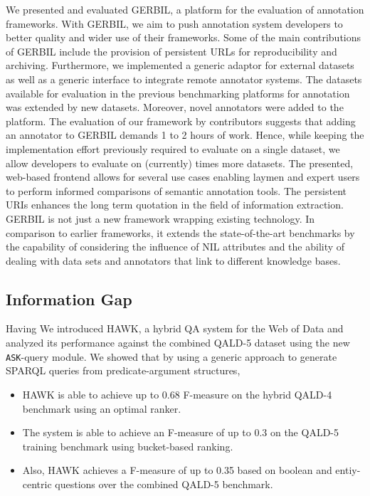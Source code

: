 We presented and evaluated GERBIL, a platform for the evaluation of annotation frameworks. With GERBIL, we aim to push annotation system developers to better quality and wider use of their frameworks.
Some of the main contributions of GERBIL include the provision of persistent URLs for reproducibility and archiving.
Furthermore, we implemented a generic adaptor for external datasets as well as a generic interface to integrate remote annotator systems.
The datasets available for evaluation in the previous benchmarking platforms for annotation was extended by \numberOfadditionalDatasets new datasets. Moreover, \numberOfadditionalAnnotators novel annotators were added to the platform. 
The evaluation of our framework by contributors suggests that adding an annotator to GERBIL demands 1 to 2 hours of work. Hence, while keeping the implementation effort previously required to evaluate on a single dataset, we allow developers to evaluate on (currently) \overalldatasets times more datasets.
The presented, web-based frontend allows for several use cases enabling laymen and expert users to perform informed  comparisons of semantic annotation tools.
The persistent URIs enhances the long term quotation in the field of information extraction.
GERBIL is not just a new framework wrapping existing technology. 
In comparison to earlier frameworks, it extends the state-of-the-art benchmarks by the capability of considering the influence of NIL attributes and the ability of dealing with data sets and annotators that link to different knowledge bases.


\subsection*{Information Gap}

Having 
We introduced HAWK, a hybrid \ac{QA} system for the Web of Data and analyzed its performance against the combined \ac{QALD}-5 dataset using the new \texttt{ASK}-query module. 
We showed that by using a generic approach to generate SPARQL queries from predicate-argument structures, 
\begin{itemize}
\item HAWK is able to achieve up to 0.68 F-measure on the hybrid \ac{QALD}-4 benchmark using an optimal ranker.
\item The system is able to achieve an F-measure of up to 0.3 on the \ac{QALD}-5 training benchmark using bucket-based ranking.
\item Also, HAWK achieves a F-measure of up to 0.35 based on boolean and entiy-centric questions over the combined \ac{QALD}-5 benchmark.
\end{itemize}



